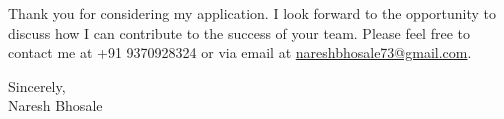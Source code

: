 \documentclass[a4paper,12pt]{article}
\begin{document}
Thank you for considering my application. I look forward to the opportunity to discuss how I can contribute to the success of your team. Please feel free to contact me at +91 9370928324 or via email at \href{mailto:nareshbhosale73@gmail.com}{nareshbhosale73@gmail.com}.

\vspace{1cm}

Sincerely, \\
Naresh Bhosale
\end{document}
